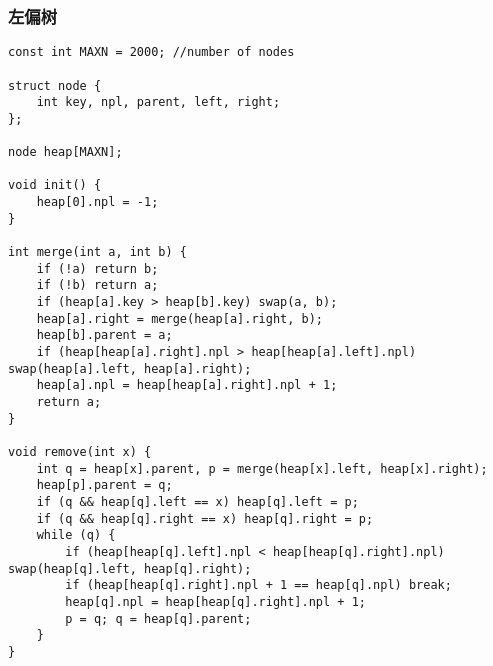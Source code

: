 \subsubsection{左偏树}
\begin{verbatim}
const int MAXN = 2000; //number of nodes

struct node {
    int key, npl, parent, left, right;
};

node heap[MAXN];

void init() {
    heap[0].npl = -1;
}

int merge(int a, int b) {
    if (!a) return b;
    if (!b) return a;
    if (heap[a].key > heap[b].key) swap(a, b);
    heap[a].right = merge(heap[a].right, b);
    heap[b].parent = a;
    if (heap[heap[a].right].npl > heap[heap[a].left].npl) swap(heap[a].left, heap[a].right);
    heap[a].npl = heap[heap[a].right].npl + 1;
    return a;
}

void remove(int x) {
    int q = heap[x].parent, p = merge(heap[x].left, heap[x].right);
    heap[p].parent = q;
    if (q && heap[q].left == x) heap[q].left = p;
    if (q && heap[q].right == x) heap[q].right = p;
    while (q) {
        if (heap[heap[q].left].npl < heap[heap[q].right].npl) swap(heap[q].left, heap[q].right);
        if (heap[heap[q].right].npl + 1 == heap[q].npl) break;
        heap[q].npl = heap[heap[q].right].npl + 1;
        p = q; q = heap[q].parent;
    }
}
\end{verbatim}
